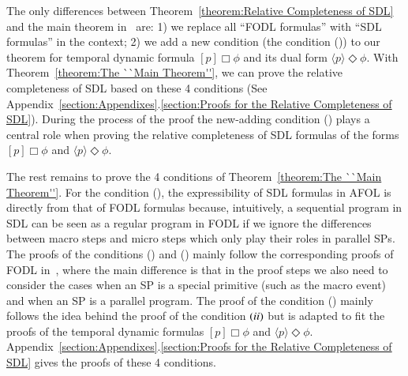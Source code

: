 \documentclass{fcs}
\newcommand{\la}[0]{\langle}
\newcommand{\ra}[0]{\rangle}
\newcommand{\rmn}[1]{(\romannumeral#1)}
\newcommand{\SP}[0]{\mathbf{SP}}
\newcommand{\NB}[0]{\mathit{NB}}
\begin{document}
The only differences between Theorem~\ref{theorem:Relative Completeness of SDL} and the main theorem in~\cite{Harel79} are:
1) we replace all ``FODL formulas'' with ``SDL formulas'' in the context;
2) we add a new condition (the condition \rmn{4}) to our theorem for temporal dynamic formula $[p]\Box\phi$ and its dual form $\la p\ra \Diamond\phi$.
With Theorem~\ref{theorem:The ``Main Theorem''}, we can prove the relative completeness of SDL based on these 4 conditions (See Appendix~\ref{section:Appendixes}.\ref{section:Proofs for the Relative Completeness of SDL}).
During the process of the proof the new-adding condition \rmn{4} plays a central role when proving the relative completeness of SDL formulas of the forms $[p]\Box\phi$ and $\la p\ra\Diamond\phi$.

The rest remains to prove the 4 conditions of Theorem~\ref{theorem:The ``Main Theorem''}.
For the condition \rmn{1}, the expressibility of SDL formulas in AFOL is directly from that of FODL formulas because, intuitively, a sequential program in SDL can be seen as a regular program in FODL if we ignore the differences between macro steps and micro steps which only play their roles in parallel SPs.
The proofs of the conditions \rmn{2} and \rmn{3} mainly follow the corresponding proofs of FODL in~\cite{Harel79}, where the main difference is that in the proof steps we also need to consider the cases when an SP is a special primitive (such as the macro event) and when an SP is a parallel program.
The proof of the condition \rmn{4} mainly follows the idea behind the proof of the condition $\rmn{2}$ but is adapted to fit the proofs of the temporal dynamic formulas $[p]\Box\phi$ and $\la p\ra\Diamond\phi$.
Appendix~\ref{section:Appendixes}.\ref{section:Proofs for the Relative Completeness of SDL} gives the proofs of these 4 conditions.
\end{document}
